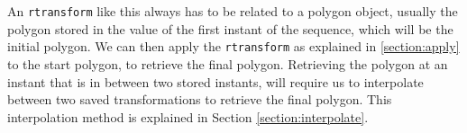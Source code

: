 An \lstinline{rtransform} like this always has to be related to a polygon object, usually the polygon stored in the value of the first instant of the sequence, which will be the initial polygon. We can then apply the \lstinline{rtransform} as explained in \ref{section:apply} to the start polygon, to retrieve the final polygon. Retrieving the polygon at an instant that is in between two stored instants, will require us to interpolate between two saved transformations to retrieve the final polygon. This interpolation method is explained in Section \ref{section:interpolate}.

